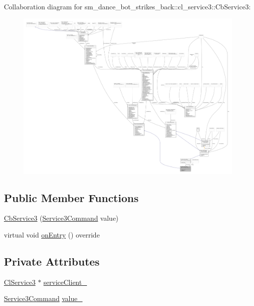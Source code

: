 Collaboration diagram for sm\+\_\+dance\+\_\+bot\+\_\+strikes\+\_\+back\+:\+:cl\+\_\+service3\+:\+:Cb\+Service3\+:
\nopagebreak
\begin{figure}[H]
\begin{center}
\leavevmode
\includegraphics[width=350pt]{classsm__dance__bot__strikes__back_1_1cl__service3_1_1CbService3__coll__graph}
\end{center}
\end{figure}
\subsection*{Public Member Functions}
\begin{DoxyCompactItemize}
\item 
\hyperlink{classsm__dance__bot__strikes__back_1_1cl__service3_1_1CbService3_a2d571bbec8f1d3d14a0e31446d3633b7}{Cb\+Service3} (\hyperlink{namespacesm__dance__bot__strikes__back_1_1cl__service3_ac2ccf5d911840620cf8d0443c29d8b6b}{Service3\+Command} value)
\item 
virtual void \hyperlink{classsm__dance__bot__strikes__back_1_1cl__service3_1_1CbService3_a09a2fda38973e1e3915b63a47ca67ed1}{on\+Entry} () override
\end{DoxyCompactItemize}
\subsection*{Private Attributes}
\begin{DoxyCompactItemize}
\item 
\hyperlink{classsm__dance__bot__strikes__back_1_1cl__service3_1_1ClService3}{Cl\+Service3} $\ast$ \hyperlink{classsm__dance__bot__strikes__back_1_1cl__service3_1_1CbService3_ae96f1d34aa0ab6b9bc7099c5c0e512de}{service\+Client\+\_\+}
\item 
\hyperlink{namespacesm__dance__bot__strikes__back_1_1cl__service3_ac2ccf5d911840620cf8d0443c29d8b6b}{Service3\+Command} \hyperlink{classsm__dance__bot__strikes__back_1_1cl__service3_1_1CbService3_a76973df60e0e3ed7d7c270d0701b8f9d}{value\+\_\+}
\end{DoxyCompactItemize}


